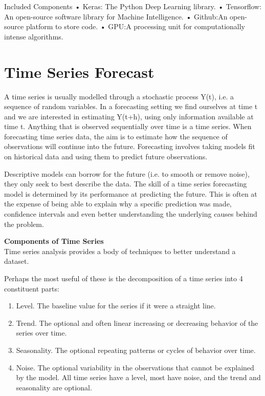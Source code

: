 \documentclass[12pt]{report}
\begin{document}
Included Components
•	Keras: The Python Deep Learning library.
•	Tensorflow: An open-source software library for Machine Intelligence.
•	Github:An open-source platform to store code.
•	GPU:A processing unit for computationally intense algorithms.


\section{Time Series Forecast}
  
A time series is usually modelled through a stochastic process Y(t), i.e. a sequence of random variables. In a forecasting setting we find ourselves at time t and we are interested in estimating Y(t+h), using only information available at time t.\cite{13}
Anything that is observed sequentially over time is a time series.
When forecasting time series data, the aim is to estimate how the sequence of observations will continue into the future.
Forecasting involves taking models fit on historical data and using them to predict future observations.

Descriptive models can borrow for the future (i.e. to smooth or remove noise), they only seek to best describe the data.
The skill of a time series forecasting model is determined by its performance at predicting the future. This is often at the expense of being able to explain why a specific prediction was made, confidence intervals and even better understanding the underlying causes behind the problem.

\textbf{Components of Time Series} \\
Time series analysis provides a body of techniques to better understand a dataset.

Perhaps the most useful of these is the decomposition of a time series into 4 constituent parts:

\begin{enumerate}
  \item Level. The baseline value for the series if it were a straight line.
  \item Trend. The optional and often linear increasing or decreasing behavior of the series over time.
  \item Seasonality. The optional repeating patterns or cycles of behavior over time.
  \item Noise. The optional variability in the observations that cannot be explained by the model.
All time series have a level, most have noise, and the trend and seasonality are optional.

\end{enumerate}
\end{document}
